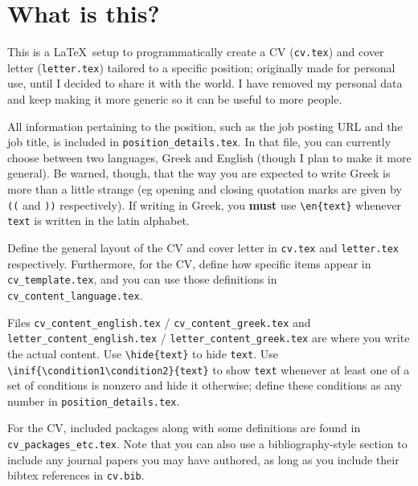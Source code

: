 \documentclass[11pt]{article}
\begin{document}
\section*{What is this?}

This is a \LaTeX~setup to programmatically create a CV (\verb+cv.tex+) and cover letter (\verb+letter.tex+) tailored to a specific position; originally made for personal use, until I decided to share it with the world. I have removed my personal data and keep making it more generic so it can be useful to more people.

All information pertaining to the position, such as the job posting URL and the job title, is included in \verb+position_details.tex+. In that file, you can currently choose between two languages, Greek and English (though I plan to make it more general). Be warned, though, that the way you are expected to write Greek is more than a little strange (eg opening and closing quotation marks are given by \verb+((+ and \verb+))+ respectively). If writing in Greek, you \textbf{must} use \verb+\en{text}+ whenever \verb+text+ is written in the latin alphabet.

Define the general layout of the CV and cover letter in \verb+cv.tex+ and \verb+letter.tex+ respectively. Furthermore, for the CV, define how specific items appear in \verb+cv_template.tex+, and you can use those definitions in \verb+cv_content_language.tex+.

Files \verb+cv_content_english.tex+ / \verb+cv_content_greek.tex+ and\\\verb+letter_content_english.tex+ / \verb+letter_content_greek.tex+ are where you write the actual content. Use \verb+\hide{text}+ to hide \verb+text+. Use\\\verb+\inif{\condition1\condition2}{text}+ to show \verb+text+ whenever at least one of a set of conditions is nonzero and hide it otherwise; define these conditions as any number in \verb+position_details.tex+.

For the CV, included packages along with some definitions are found in \verb+cv_packages_etc.tex+. Note that you can also use a bibliography-style section to include any journal papers you may have authored, as long as you include their bibtex references in \verb+cv.bib+.
\end{document}
